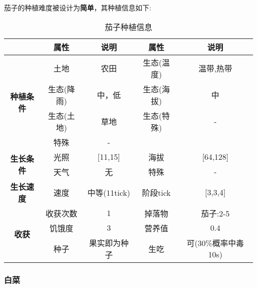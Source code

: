 茄子的种植难度被设计为\textbf{简单}，其种植信息如下:

\begin{table}[H]
    \centering
    \caption{茄子种植信息}
    \label{table:茄子种植信息}
    \setlength{\tabcolsep}{4mm}
    \begin{tabular}{c|cc|cc}
        \toprule
                                           & \textbf{属性} & \textbf{说明} & \textbf{属性} & \textbf{说明} \\
        \midrule
        \multirow{4}{*}{\textbf{种植条件}} & 土地          & 农田          & 生态(温度)    & 温带,热带    \\
                                           & 生态(降雨)    & 中，低        & 生态(海拔)    & 中            \\
                                           & 生态(土地)    & 草地          & 生态(特殊)    & -             \\
                                           & 特殊          & -                                             \\
        \midrule
        \multirow{2}{*}{\textbf{生长条件}} & 光照          & [11,15]        & 海拔          & [64,128]      \\
                                           & 天气          & 无            & 特殊          & -             \\
        \midrule
        \textbf{生长速度}                  & 速度          & 中等(11tick)     & 阶段tick      & [3,3,4]       \\
        \midrule
        \multirow{3}{*}{\textbf{收获}}     & 收获次数      & 1             & 掉落物        & 茄子:2-5      \\
                                           & 饥饿度        & 3             & 营养值        & 0.4           \\
                                           & 种子          & 果实即为种子  & 生吃          & 可(30\%概率中毒 10s) \\
        \bottomrule
    \end{tabular}
\end{table}

\subsubsection{白菜}


